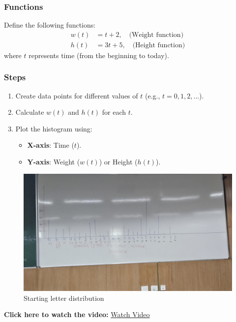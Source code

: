 \documentclass{report}
\begin{document}
\subsubsection*{Functions}
Define the following functions:
\begin{align*}
    w(t) &= t + 2, \quad \text{(Weight function)} \\
    h(t) &= 3t + 5, \quad \text{(Height function)}
\end{align*}
where \( t \) represents time (from the beginning to today).

\subsubsection*{Steps}
\begin{enumerate}
    \item Create data points for different values of \( t \) (e.g., \( t = 0, 1, 2, \dots \)).
    \item Calculate \( w(t) \) and \( h(t) \) for each \( t \).
    \item Plot the histogram using:
    \begin{itemize}
        \item \textbf{X-axis}: Time (\( t \)).
        \item \textbf{Y-axis}: Weight (\( w(t) \)) or Height (\( h(t) \)).
    \end{itemize}
\end{enumerate} 

\begin{figure}
    \centering
    \includegraphics[width=0.8\linewidth]{starting_letter_frequency.jpg}
    \caption{Starting letter distribution}
    \label{fig:starting_letter_distribution}
\end{figure} 


\textbf{Click here to watch the video:} \href{https://drive.google.com/file/d/1g_NWFWEwnrwKtEe_6Ub3wr88oSFAZrdw/view?usp=drive_link}{Watch Video}
\end{document}
